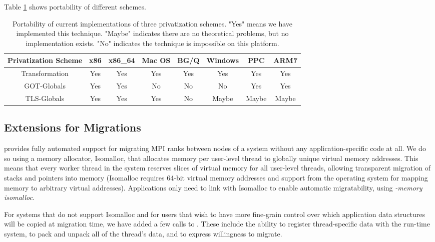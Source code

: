 \documentclass[10pt]{article}
\begin{document}
Table \ref{tab:portability} shows portability of different schemes.

\begin{table}[!tb]
\begin{center}
\begin{tabular}{|c||c|c|c|c|c|c|c|}
\hline
Privatization Scheme     & x86     & x86\_64  & Mac OS & BG/Q  & Windows & PPC   & ARM7  \\
\hline
\hline
Transformation           & Yes     & Yes     & Yes     & Yes   & Yes     & Yes   & Yes   \\
\hline
GOT-Globals              & Yes     & Yes     & No      & No    & No      & Yes   & Yes   \\
\hline
TLS-Globals              & Yes     & Yes     & Yes     & No    & Maybe   & Maybe & Maybe \\
\hline
\end{tabular}
\caption{Portability of current implementations of three privatization schemes.
"Yes" means we have implemented this technique.
"Maybe" indicates there are no theoretical problems, but no implementation exists.
"No" indicates the technique is impossible on this platform.}
\label{tab:portability}
\vspace{-1.0cm}
\end{center}
\end{table}
\subsection{Extensions for Migrations}

\ampi{} provides fully automated support for migrating MPI ranks between nodes of a
system without any application-specific code at all. We do so using a memory
allocator, Isomalloc, that allocates memory per user-level thread to globally
unique virtual memory addresses. This means that every worker thread in the system
reserves slices of virtual memory for all user-level threads, allowing transparent migration
of stacks and pointers into memory (Isomalloc requires 64-bit virtual memory
addresses and support from the operating system for mapping memory to arbitrary
virtual addresses). Applications only need to link with Isomalloc to enable
automatic migratability, using \emph{-memory isomalloc}.

For systems that do not support Isomalloc and for users that wish to have more
fine-grain control over which application data structures will be copied at
migration time, we have added a few calls to \ampi{}. These include
the ability to register thread-specific data with the run-time system, to pack
and unpack all of the thread's data, and to express willingness to migrate.
\end{document}
